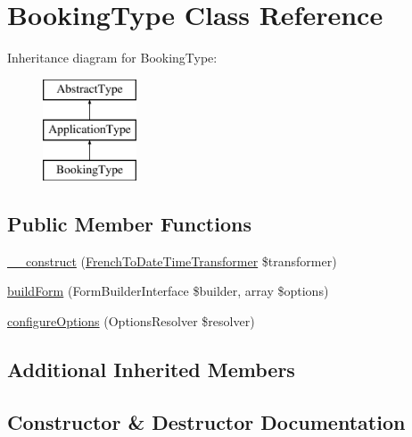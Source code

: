 \hypertarget{class_app_1_1_form_1_1_booking_type}{}\section{Booking\+Type Class Reference}
\label{class_app_1_1_form_1_1_booking_type}
Inheritance diagram for Booking\+Type\+:\begin{figure}[H]
\begin{center}
\leavevmode
\includegraphics[height=3.000000cm]{class_app_1_1_form_1_1_booking_type}
\end{center}
\end{figure}
\subsection*{Public Member Functions}
\begin{DoxyCompactItemize}
\item 
\mbox{\hyperlink{class_app_1_1_form_1_1_booking_type_ab77cf3b8755f6467c07c9c973ff8677f}{\+\_\+\+\_\+construct}} (\mbox{\hyperlink{class_app_1_1_form_1_1_data_transformer_1_1_french_to_date_time_transformer}{French\+To\+Date\+Time\+Transformer}} \$transformer)
\item 
\mbox{\hyperlink{class_app_1_1_form_1_1_booking_type_a83c3745710374f9c5a1eb0686fe2dfab}{build\+Form}} (Form\+Builder\+Interface \$builder, array \$options)
\item 
\mbox{\hyperlink{class_app_1_1_form_1_1_booking_type_a8ff68a86f5090b5df973286836e46ead}{configure\+Options}} (Options\+Resolver \$resolver)
\end{DoxyCompactItemize}
\subsection*{Additional Inherited Members}


\subsection{Constructor \& Destructor Documentation}
\mbox{\label{class_app_1_1_form_1_1_booking_type_ab77cf3b8755f6467c07c9c973ff8677f}} 
